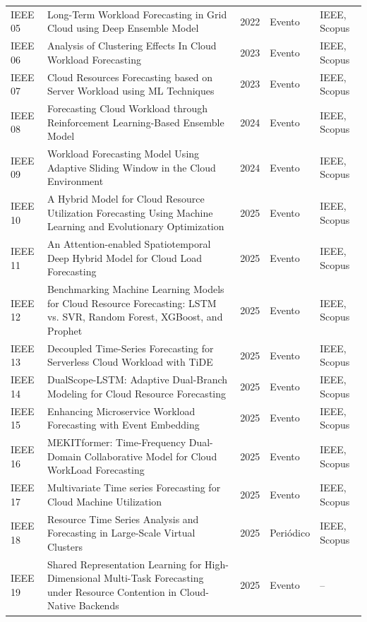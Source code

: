 {\begin{longtable}{p{1.4cm}p{9.3cm}p{0.9cm}p{1.5cm}p{1.7cm}}
IEEE 05 & Long-Term Workload Forecasting in Grid Cloud using Deep Ensemble Model \cite{bao2022} & 2022 & Evento & IEEE, Scopus \\
IEEE 06 & Analysis of Clustering Effects In Cloud Workload Forecasting \cite{sathiya2023} & 2023 & Evento & IEEE, Scopus \\
IEEE 07 & Cloud Resources Forecasting based on Server Workload using ML Techniques \cite{janjanam2023} & 2023 & Evento & IEEE, Scopus \\
IEEE 08 & Forecasting Cloud Workload through Reinforcement Learning-Based Ensemble Model \cite{kang2024} & 2024 & Evento & IEEE, Scopus \\
IEEE 09 & Workload Forecasting Model Using Adaptive Sliding Window in the Cloud Environment \cite{lavanya2024} & 2024 & Evento & IEEE, Scopus \\
IEEE 10 & A Hybrid Model for Cloud Resource Utilization Forecasting Using Machine Learning and Evolutionary Optimization \cite{alrwbaye2025} & 2025 & Evento & IEEE, Scopus \\
IEEE 11 & An Attention-enabled Spatiotemporal Deep Hybrid Model for Cloud Load Forecasting \cite{nayak2025} & 2025 & Evento & IEEE, Scopus \\
IEEE 12 & Benchmarking Machine Learning Models for Cloud Resource Forecasting: LSTM vs. SVR, Random Forest, XGBoost, and Prophet \cite{mamushiane2025} & 2025 & Evento & IEEE, Scopus \\
IEEE 13 & Decoupled Time-Series Forecasting for Serverless Cloud Workload with TiDE \cite{suo2025} & 2025 & Evento & IEEE, Scopus \\
IEEE 14 & DualScope-LSTM: Adaptive Dual-Branch Modeling for Cloud Resource Forecasting \cite{bhatia2025} & 2025 & Evento & IEEE, Scopus \\
IEEE 15 & Enhancing Microservice Workload Forecasting with Event Embedding \cite{wang2025} & 2025 & Evento & IEEE, Scopus \\
IEEE 16 & MEKITformer: Time-Frequency Dual-Domain Collaborative Model for Cloud WorkLoad Forecasting \cite{lin2025b} & 2025 & Evento & IEEE, Scopus \\
IEEE 17 & Multivariate Time series Forecasting for Cloud Machine Utilization \cite{naik2025} & 2025 & Evento & IEEE, Scopus \\
IEEE 18 & Resource Time Series Analysis and Forecasting in Large-Scale Virtual Clusters \cite{lin2025c} & 2025 & Periódico & IEEE, Scopus \\
IEEE 19 & Shared Representation Learning for High-Dimensional Multi-Task Forecasting under Resource Contention in Cloud-Native Backends \cite{huang2025} & 2025 & Evento & -- \\

\end{longtable}}
